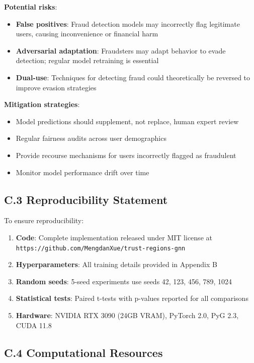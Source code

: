 \textbf{Potential risks}:
\begin{itemize}
\item \textbf{False positives}: Fraud detection models may incorrectly flag legitimate users, causing inconvenience or financial harm
\item \textbf{Adversarial adaptation}: Fraudsters may adapt behavior to evade detection; regular model retraining is essential
\item \textbf{Dual-use}: Techniques for detecting fraud could theoretically be reversed to improve evasion strategies
\end{itemize}

\textbf{Mitigation strategies}:
\begin{itemize}
\item Model predictions should supplement, not replace, human expert review
\item Regular fairness audits across user demographics
\item Provide recourse mechanisms for users incorrectly flagged as fraudulent
\item Monitor model performance drift over time
\end{itemize}

\subsection*{C.3 Reproducibility Statement}

To ensure reproducibility:

\begin{enumerate}
\item \textbf{Code}: Complete implementation released under MIT license at \texttt{https://github.com/MengdanXue/trust-regions-gnn}
\item \textbf{Hyperparameters}: All training details provided in Appendix B
\item \textbf{Random seeds}: 5-seed experiments use seeds 42, 123, 456, 789, 1024
\item \textbf{Statistical tests}: Paired t-tests with p-values reported for all comparisons
\item \textbf{Hardware}: NVIDIA RTX 3090 (24GB VRAM), PyTorch 2.0, PyG 2.3, CUDA 11.8
\end{enumerate}

\subsection*{C.4 Computational Resources}

